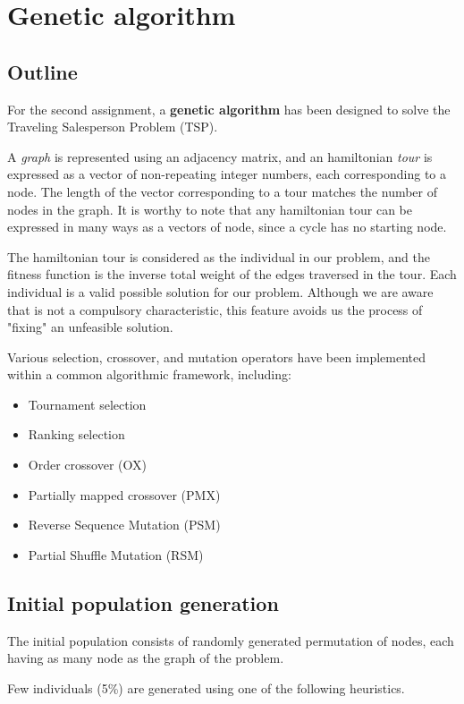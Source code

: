 \documentclass[../main.tex]{subfiles}
\begin{document}
\section{Genetic algorithm}
\subsection{Outline}
For the second assignment, a \textbf{genetic algorithm} has been designed to solve the Traveling Salesperson Problem (TSP).

A \textit{graph} is represented using an adjacency matrix, and an hamiltonian \textit{tour} is expressed as a vector of non-repeating integer numbers, each corresponding to a node. The length of the vector corresponding to a tour matches the number of nodes in the graph. It is worthy to note that any hamiltonian tour can be expressed in many ways as a vectors of node, since a cycle has no starting node.

The hamiltonian tour is considered as the individual in our problem, and the fitness function is the inverse total weight of the edges traversed in the tour. Each individual is a valid possible solution for our problem. Although we are aware that is not a compulsory characteristic, this feature avoids us the process of "fixing" an unfeasible solution.

Various selection, crossover, and mutation operators have been implemented within a common algorithmic framework, including:

\begin{itemize}
    \item Tournament selection
    \item Ranking selection
    \item Order crossover (OX)
    \item Partially mapped crossover (PMX)
    \item Reverse Sequence Mutation (PSM)
    \item Partial Shuffle Mutation (RSM)
\end{itemize}


\subsection{Initial population generation}
The initial population consists of randomly generated permutation of nodes, each having as many node as the graph of the problem.

Few individuals (5\%) are generated using one of the following heuristics.
\end{document}
